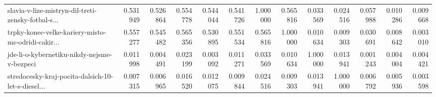 \begin{tabular}{lrrrrrrrrrrrr}
slavia-v-lize-mistryn-dil-treti-zensky-fotbal-s... &                                           0.531949 &                                           0.526864 &                                           0.554778 &                                           0.544044 &                                           0.541726 &                                           1.000000 &                                           0.565816 &                                     0.033569 &                                           0.024516 &                                           0.057988 &                                           0.010286 &                                           0.009668 \\
trpky-konec-velke-kariery-misto-ms-odridi-cakir... &                                           0.557277 &                                           0.545482 &                                           0.565356 &                                           0.530895 &                                           0.551534 &                                           0.565816 &                                           1.000000 &                                     0.010634 &                                           0.009303 &                                           0.030691 &                                           0.008642 &                                           0.003010 \\
jde-li-o-kybernetiku-nikdy-nejsme-v-bezpeci        &                                           0.011998 &                                           0.004491 &                                           0.023199 &                                           0.003092 &                                           0.011271 &                                           0.033569 &                                           0.010634 &                                     1.000000 &                                           0.013941 &                                           0.001243 &                                           0.004004 &                                           0.004421 \\
stredocesky-kraj-pocita-dalsich-10-let-s-diesel... &                                           0.007315 &                                           0.006965 &                                           0.016520 &                                           0.012075 &                                           0.009844 &                                           0.024516 &                                           0.009303 &                                     0.013941 &                                           1.000000 &                                           0.006792 &                                           0.005936 &                                           0.003598 \\

\end{tabular}
